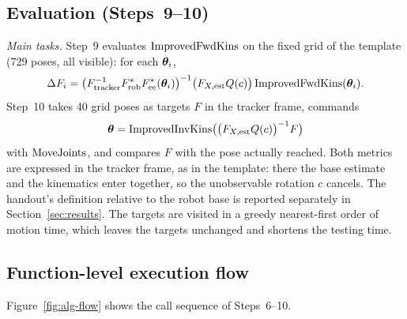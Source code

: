 \documentclass[../main.tex]{subfiles}
\begin{document}
\subsection{Evaluation (Steps~9--10)}\label{sec:alg-eval}
\noindent\textit{Main tasks.} Step~9 evaluates $\operatorname{ImprovedFwdKins}$ on the fixed grid of the template (729 poses, all visible): for each $\bm{\theta}_i$,
\begin{equation}\label{eq:alg-fwd-metric}
\Delta F_i=\bigl(F_{\mathrm{tracker}}^{-1}F^*_{\mathrm{rob}}F^*_{\mathrm{ee}}(\bm{\theta}_i)\bigr)^{-1}\bigl(F_{X,\mathrm{est}}Q(c)\bigr)\operatorname{ImprovedFwdKins}(\bm{\theta}_i).
\end{equation}
Step~10 takes 40 grid poses as targets $F$ in the tracker frame, commands
\begin{equation}
\bm{\theta}=\operatorname{ImprovedInvKins}\bigl(\bigl(F_{X,\mathrm{est}}Q(c)\bigr)^{-1}F\bigr)
\end{equation}
with $\operatorname{MoveJoints}$, and compares $F$ with the pose actually reached. Both metrics are expressed in the tracker frame, as in the template: there the base estimate and the kinematics enter together, so the unobservable rotation $c$ cancels. The handout's definition relative to the robot base is reported separately in Section~\ref{sec:results}. The targets are visited in a greedy nearest-first order of motion time, which leaves the targets unchanged and shortens the testing time.

\subsection{Function-level execution flow}
Figure~\ref{fig:alg-flow} shows the call sequence of Steps~6--10.
\end{document}
